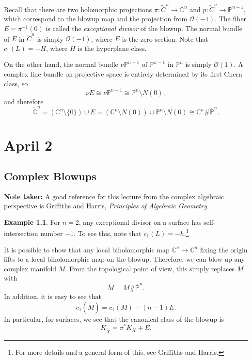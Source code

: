 \documentclass[leqno, openany]{memoir}
\theoremstyle{definition}
\newtheorem{exm}[thm]{Example}
\theoremstyle{remark}
\theoremstyle{plain}
\theoremstyle{definition}
\theoremstyle{remark}
\renewcommand{\C}{\mathbb{C}}
\renewcommand{\P}{\mathbb{P}}
\newcommand{\mc}[1]{\mathcal{#1}}
\begin{document}
    Recall that there are two holomorphic projections $\pi: \widetilde{C}^n \to \C^n$ and $p: \widetilde{C}^n \to \P^{n-1}$, which correspond to the blowup map and the projection from $\mc{O}(-1)$. The fiber $E = \pi^{-1}(0)$ is called the \textit{exceptional divisor} of the blowup. The normal bundle of $E$ in $\widetilde{C}^n$ is simply $\mc{O}(-1)$, where $E$ is the zero section. Note that $c_1(L) = -H$, where $H$ is the hyperplane class. 

    On the other hand, the normal bundle $\nu \P^{n-1}$ of $\P^{n-1}$ in $\P^n$ is simply $\mc{O}(1)$. A complex line bundle on projective space is entirely determined by its first Chern class, so 
    \[ \overline{\nu E} \cong \nu \P^{n-1} \cong \P^n \setminus N(0), \]
    and therefore
    \[ \widetilde{\C}^n = (\C^n \setminus \{0\} ) \cup E = (\C^n \setminus N(0)) \cup \overline{\P^n \setminus N(0)} \cong \C^n \# \overline{\P}^n. \]

    \chapter{April 2}%
    \label{cha:april_2}

    \section{Complex Blowups}%
    \label{sec:complex_blowups}

    \textbf{Note taker:} A good reference for this lecture from the complex algebraic perspective is Griffiths and Harris, \textit{Principles of Algebraic Geometry.}

    \begin{exm}
        For $n = 2$, any exceptional divisor on a surface has self-intersection number $-1$. To see this, note that $c_1(L) = -h$.\footnote{For more details and a general form of this, see Griffiths and Harris.}
    \end{exm}

    It is possible to show that any local biholomorphic map $\C^n \to \C^n$ fixing the origin lifts to a local biholomorphic map on the blowup. Therefore, we can blow up any complex manifold $M$. From the topological point of view, this simply replaces $M$ with 
    \[ \widetilde{M} = M \# \overline{\P}^{n}. \] 
    In addition, it is easy to see that
    \[ c_1(\widetilde{M}) = c_1(M) - (n-1) E. \]
    In particular, for surfaces, we see that the canonical class of the blowup is
    \[ K_{\widetilde{X}} = \pi^* K_X + E. \]
\end{document}
